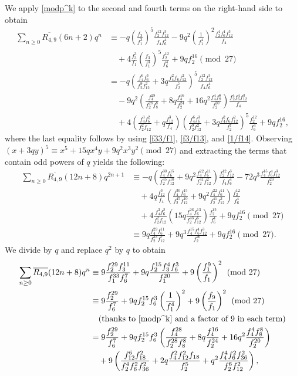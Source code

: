\documentclass{amsart}
\theoremstyle{definition}
\begin{document}
We apply \eqref{modp^k} to the second and fourth terms on the right-hand side to obtain
\begin{align*}
\sum_{n\geq0}\overline{R_{4,9}}(6n+2)q^n&\equiv-q\left(\frac{f_3}{f_1^3}\right)^5\frac{f_2^{12}f_{12}^3}{f_4f_6^4}-9q^2\left(\frac{1}{f_1^4}\right)^2\frac{f_2^4f_6^4f_{12}^3}{f_4}\\
&\quad +4\frac{f_3^3}{f_1}\left(\frac{f_3}{f_1^3}\right)^5\frac{f_2^{12}}{f_6^4}+9qf_2^{16}\pmod{27}\\
&=-q\left(\frac{f_4^6f_6^3}{f_2^9f_{12}^2}+3q\frac{f_4^2f_6f_{12}^2}{f_2^7}\right)^5\frac{f_2^{12}f_{12}^3}{f_4f_6^4}\\
&\quad-9q^2\left(\frac{f_4^{28}}{f_2^{28}f_8^8}+8q\frac{f_4^{16}}{f_2^{24}}+16q^2\frac{f_4^4f_8^8}{f_2^{20}}\right)\frac{f_2^4f_6^4f_{12}^3}{f_4}\\
&\quad+4\left(\frac{f_4^3f_6^2}{f_2^2f_{12}}+q\frac{f_{12}^3}{f_4}\right)\left(\frac{f_4^6f_6^3}{f_2^9f_{12}^2}+3q\frac{f_4^2f_6f_{12}^2}{f_2^7}\right)^5\frac{f_2^{12}}{f_6^4}+9qf_2^{16},
\end{align*}
where the last equality follows by using \eqref{f33/f1}, \eqref{f3/f13}, and \eqref{1/f14}. Observing $(x+3qy)^5\equiv x^5+15qx^4y+9q^2x^3y^2\pmod{27}$ and extracting the terms that contain odd powers of $q$ yields the following:
\begin{align*}
\sum_{n\geq0}\overline{R_{4,9}}(12n+8)q^{2n+1}&\equiv-q\left(\frac{f_4^{30}f_6^{15}}{f_2^{45}f_{12}^{10}}+9q^2\frac{f_4^{22}f_6^{11}}{f_2^{41}f_{12}^2}\right)\frac{f_2^{12}f_{12}^3}{f_4f_6^4}-72q^3\frac{f_4^{15}f_6^4f_{12}^3}{f_2^{20}}\\
&\quad+4q\frac{f_{12}^3}{f_4}\left(\frac{f_4^{30}f_6^{15}}{f_2^{45}f_{12}^{10}}+9q^2\frac{f_4^{22}f_6^{11}}{f_2^{41}f_{12}^2}\right)\frac{f_2^{12}}{f_6^4}\\
&\quad+4\frac{f_4^3f_6^2}{f_2^2f_{12}}\left(15q\frac{f_4^{26}f_6^{13}}{f_2^{43}f_{12}^6}\right)\frac{f_2^{12}}{f_6^4}+9qf_2^{16}\pmod{27}\\
&\equiv9q\frac{f_4^{29}f_6^{11}}{f_2^{33}f_{12}^7}+9q^3\frac{f_4^{15}f_6^4f_{12}^3}{f_2^{20}}+9qf_2^{16}\pmod{27}.
\end{align*}
We divide by $q$ and replace $q^2$ by $q$ to obtain
\begin{align*}
\sum_{n\geq0}\overline{R_{4,9}}(12n+8)q^n&\equiv 9\frac{f_2^{29}f_3^{11}}{f_1^{33}f_{6}^7}+9q\frac{f_2^{15}f_3^4f_{6}^3}{f_1^{20}}+9\left(\frac{f_1^9}{f_1}\right)^2\pmod{27}\\
&\equiv9\frac{f_2^{29}}{f_6^7}+9qf_2^{15}f_6^3\left(\frac{1}{f_1^4}\right)^2+9\left(\frac{f_9}{f_1}\right)^2\pmod{27}\\
&\quad\text{(thanks to  \eqref{modp^k} and a factor of 9 in each term)}\\
&=9\frac{f_2^{29}}{f_6^7}+9qf_2^{15}f_6^3\left(\frac{f_4^{28}}{f_2^{28}f_8^8}+8q\frac{f_4^{16}}{f_2^{24}}+16q^2\frac{f_4^4f_8^8}{f_2^{20}}\right)\\
&\quad+9\left(\frac{f_{12}^6f_{18}^2}{f_2^4f_6^2f_{36}^2}+2q\frac{f_4^2f_{12}^2f_{18}}{f_2^5}+q^2\frac{f_4^4f_6^2f_{36}^2}{f_2^6f_{12}^2}\right),
\end{align*}
\end{document}

